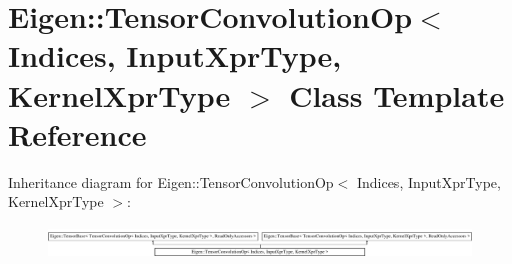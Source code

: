 \hypertarget{class_eigen_1_1_tensor_convolution_op}{}\section{Eigen\+:\+:Tensor\+Convolution\+Op$<$ Indices, Input\+Xpr\+Type, Kernel\+Xpr\+Type $>$ Class Template Reference}
\label{class_eigen_1_1_tensor_convolution_op}
Inheritance diagram for Eigen\+:\+:Tensor\+Convolution\+Op$<$ Indices, Input\+Xpr\+Type, Kernel\+Xpr\+Type $>$\+:\begin{figure}[H]
\begin{center}
\leavevmode
\includegraphics[height=0.873635cm]{class_eigen_1_1_tensor_convolution_op}
\end{center}
\end{figure}
